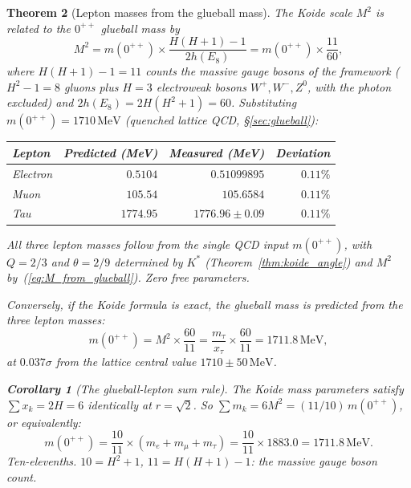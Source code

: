 \documentclass[11pt,a4paper]{article}
\let\hline\midrule
\newtheorem{theorem}{Theorem}[section]
\newtheorem{corollary}[theorem]{Corollary}
\theoremstyle{definition}
\theoremstyle{remark}
\begin{document}
\begin{theorem}[Lepton masses from the glueball mass]\label{thm:lepton_from_glueball}
The Koide scale $M^2$ is related to the $0^{++}$ glueball mass by
\begin{equation}\label{eq:M_from_glueball}
M^2 = m(0^{++})\times\frac{H(H+1)-1}{2h(E_8)} = m(0^{++})\times\frac{11}{60},
\end{equation}
where $H(H+1)-1=11$ counts the massive gauge bosons of the framework ($H^2-1=8$ gluons plus $H=3$ electroweak bosons $W^+,W^-,Z^0$, with the photon excluded) and $2h(E_8)=2H(H^2+1)=60$. Substituting $m(0^{++})=1710\,\mathrm{MeV}$ (quenched lattice QCD, \S\ref{sec:glueball}):

\begin{center}
\begin{tabular}{lrrr}
\hline
Lepton & Predicted (MeV) & Measured (MeV) & Deviation \\
\hline
Electron & $0.5104$ & $0.51099895$ & $0.11\%$ \\
Muon & $105.54$ & $105.6584$ & $0.11\%$ \\
Tau & $1774.95$ & $1776.96\pm 0.09$ & $0.11\%$ \\
\hline
\end{tabular}
\end{center}

All three lepton masses follow from the single QCD input $m(0^{++})$, with $Q=2/3$ and $\theta=2/9$ determined by $K^*$ (Theorem~\ref{thm:koide_angle}) and $M^2$ by~(\ref{eq:M_from_glueball}). Zero free parameters.

Conversely, if the Koide formula is exact, the glueball mass is predicted from the three lepton masses:
\begin{equation}\label{eq:glueball_from_leptons}
m(0^{++}) = M^2\times\frac{60}{11} = \frac{m_\tau}{x_\tau}\times\frac{60}{11} = 1711.8\,\mathrm{MeV},
\end{equation}
at $0.037\sigma$ from the lattice central value $1710\pm 50\,\mathrm{MeV}$.

\begin{corollary}[The glueball-lepton sum rule]\label{cor:glueball_lepton}
The Koide mass parameters satisfy $\sum x_k=2H=6$ identically at $r=\sqrt{2}$. So $\sum m_k=6M^2=(11/10)\,m(0^{++})$, or equivalently:
\begin{equation}\label{eq:glueball_lepton_sum}
m(0^{++})=\frac{10}{11}\times(m_e+m_\mu+m_\tau)=\frac{10}{11}\times 1883.0=1711.8\,\mathrm{MeV}.
\end{equation}
Ten-elevenths. $10=H^2+1$, $11=H(H+1)-1$: the massive gauge boson count.
\end{corollary}
\end{theorem}
\end{document}
